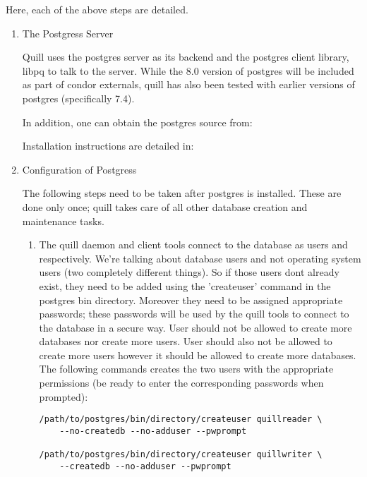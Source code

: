 Here, each of the above steps are detailed.

\begin{enumerate}
\item The Postgress Server

Quill uses the postgres server as its backend and the postgres client
library, libpq to talk to the server. While the 8.0 version of postgres
will be included as part of condor externals, quill has also been tested
with earlier versions of postgres (specifically 7.4).

In addition, one can obtain the postgres source from:


Installation instructions are detailed in:

\item Configuration of Postgress

The following steps need to be taken after postgres is installed.  These
are done only once; quill takes care of all other database creation and
maintenance tasks.

\begin{enumerate}
\item The quill daemon and client tools connect to the database as
users  and  respectively.
We're talking about database users and not operating system users (two
completely different things).  So if those users dont already exist,
they need to be added using the 'createuser' command in the postgres bin
directory.  Moreover they need to be assigned appropriate passwords; these
passwords will be used by the quill tools to connect to the database in a
secure way.  User  should not be allowed to create
more databases nor create more users.  User  should
also not be allowed to create more users however it should be allowed
to create more databases.  The following commands creates the two users
with the appropriate permissions (be ready to enter the corresponding
passwords when prompted):

\begin{verbatim}
/path/to/postgres/bin/directory/createuser quillreader \
	--no-createdb --no-adduser --pwprompt

/path/to/postgres/bin/directory/createuser quillwriter \
	--createdb --no-adduser --pwprompt
\end{verbatim}


\end{enumerate}
\end{enumerate}
